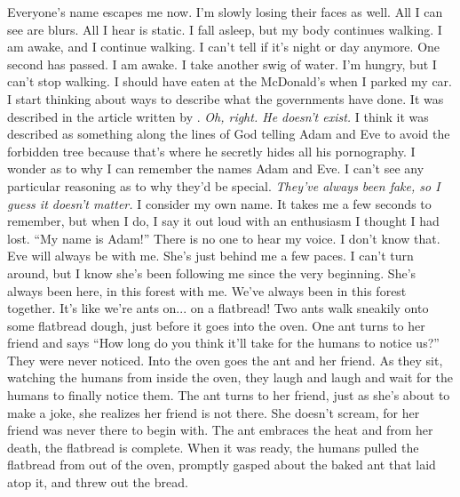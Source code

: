\documentclass[a4paper, 12pt]{book}
\newcommand\tab[1][1cm]{\hspace*{#1}}
\begin{document}
\newline
\tab
Everyone’s name escapes me now. I’m slowly losing their faces as well. All I can see are blurs. All I hear is static. I fall asleep, but my body continues walking. I am awake, and I continue walking. I can’t tell if it’s night or day anymore. One second has passed. I am awake. I take another swig of water. I’m hungry, but I can't stop walking. I should have eaten at the McDonald’s when I parked my car. 
\newline
\tab
I start thinking about ways to describe what the governments have done. It was described in the article written by \underline{\hspace{2cm}}. 
\newline
\tab
\textit{Oh, right. He doesn’t exist. }
\newline
I think it was described as something along the lines of God telling Adam and Eve to avoid the forbidden tree because that’s where he secretly hides all his pornography. I wonder as to why I can remember the names Adam and Eve. I can’t see any particular reasoning as to why they’d be special.
\newline
\tab
\textit{They’ve always been fake, so I guess it doesn’t matter.}
\newline
\tab
I consider my own name. It takes me a few seconds to remember, but when I do, I say it out loud with an enthusiasm I thought I had lost. 
\newline
\tab
“My name is Adam!” 
\newline
\tab
There is no one to hear my voice. I don’t know that. Eve will always be with me. She’s just behind me a few paces. I can’t turn around, but I know she’s been following me since the very beginning. She’s always been here, in this forest with me. We’ve always been in this forest together. It’s like we’re ants on... on a flatbread! 
\newline
\tab
Two ants walk sneakily onto some flatbread dough, just before it goes into the oven. One ant turns to her friend and says “How long do you think it’ll take for the humans to notice us?” They were never noticed. Into the oven goes the ant and her friend. As they sit, watching the humans from inside the oven, they laugh and laugh and wait for the humans to finally notice them. The ant turns to her friend, just as she’s about to make a joke, she realizes her friend is not there. She doesn’t scream, for her friend was never there to begin with. The ant embraces the heat and from her death, the flatbread is complete. When it was ready, the humans pulled the flatbread from out of the oven, promptly gasped about the baked ant that laid atop it, and threw out the bread.  
\end{document}
